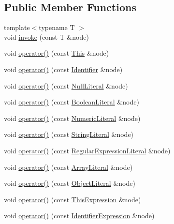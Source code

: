 \subsection*{Public Member Functions}
\begin{DoxyCompactItemize}
\item 
{\footnotesize template$<$typename T $>$ }\\void \hyperlink{struct_delegate_vistor_af9662a5d46b463eaf5687383d0720da9}{invoke} (const T \&node)
\item 
void \hyperlink{struct_delegate_vistor_a8dace5cc6d8f07fa159bf17c0e2ab35d}{operator()} (const \hyperlink{struct_this}{This} \&node)
\item 
void \hyperlink{struct_delegate_vistor_ac0c8ef853f15168a8ecae04d0a901042}{operator()} (const \hyperlink{struct_identifier}{Identifier} \&node)
\item 
void \hyperlink{struct_delegate_vistor_aec595975fc76a47a9181b28cb1b07d28}{operator()} (const \hyperlink{struct_null_literal}{Null\+Literal} \&node)
\item 
void \hyperlink{struct_delegate_vistor_a5b0414c4f00fd368ce65ae03f44ad5a0}{operator()} (const \hyperlink{struct_boolean_literal}{Boolean\+Literal} \&node)
\item 
void \hyperlink{struct_delegate_vistor_a7447ce0cf89a2cce50016f1e6be2e427}{operator()} (const \hyperlink{struct_numeric_literal}{Numeric\+Literal} \&node)
\item 
void \hyperlink{struct_delegate_vistor_a8197fd5f76ca1c4c23de591522865081}{operator()} (const \hyperlink{struct_string_literal}{String\+Literal} \&node)
\item 
void \hyperlink{struct_delegate_vistor_a4850452c1da6f05c0bcae9797f6feec6}{operator()} (const \hyperlink{struct_regular_expression_literal}{Regular\+Expression\+Literal} \&node)
\item 
void \hyperlink{struct_delegate_vistor_a63960604451464f12d814c503025c04e}{operator()} (const \hyperlink{struct_array_literal}{Array\+Literal} \&node)
\item 
void \hyperlink{struct_delegate_vistor_a1f7ce208dd82aa1a7a13b605c8f15e42}{operator()} (const \hyperlink{struct_object_literal}{Object\+Literal} \&node)
\item 
void \hyperlink{struct_delegate_vistor_a04309f21f46080e60d5d9c2dc8d859ba}{operator()} (const \hyperlink{struct_this_expression}{This\+Expression} \&node)
\item 
void \hyperlink{struct_delegate_vistor_adfdd4d12c4212dc1e951f5fd915ff785}{operator()} (const \hyperlink{struct_identifier_expression}{Identifier\+Expression} \&node)

\end{DoxyCompactItemize}
